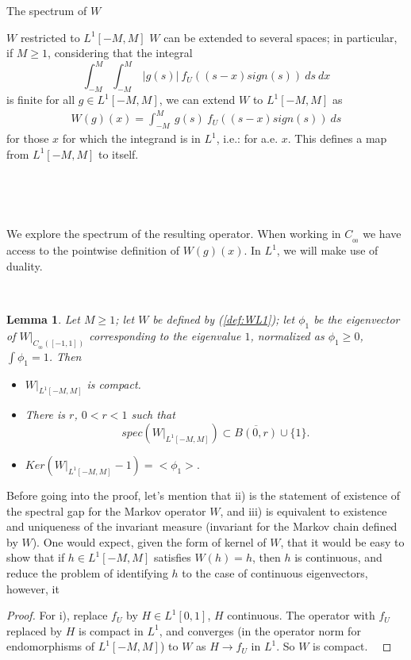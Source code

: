 \documentclass[12pt]{article}
\newtheorem*{lmm}{Lemma}
\begin{document}
\begin{section}{The spectrum of $W$ }
\begin{subsection}{$W$ restricted to $L^1[-M,M]$ }
$W$ can be extended to several spaces; in particular, if $M \ge 1$, considering that the integral 
$$
\int_{-M}^{M} \int_{-M}^{M} \ |g(s)| \ f_U\!( (s-x)sign(s) )\ ds\ dx
$$
is finite for all $g \in L^1[-M,M]$, we can extend $W$ to $L^1[-M,M]$ as
\begin{align} \label{def:WL1}
W(g)(x) = \int_{-M}^{M} \ g(s) \ f_U\!( (s-x)sign(s) )\ ds
\end{align}
for those $x$ for which the integrand is in $L^1$, i.e.: for a.e. $x$. This defines a map from $L^1[-M,M]$ to itself.  

\

\

We explore the spectrum of the resulting operator. When working in $C_{_{0\!0}}$ we have access to the pointwise definition of $W(g)(x)$. In $L^1$, we will make use of duality. 
\ 

\

 


\begin{lmm} Let $M \ge 1$; let $W$ be defined by (\ref{def:WL1}); let $\phi_1$ be the eigenvector of $W\Big|_{C_{_{0\!0}}([-1,1])} $ corresponding to the eigenvalue $1$, normalized as $\phi_1 \ge 0$, $\int \phi_1 = 1$. Then 
	\begin{itemize}
		\item[i.] $W\Big|_{L^1[-M,M]}$ is compact.
		\item[ii.] There is $r$, $0 < r < 1$ such that
		$$
		spec(W\Big|_{L^1[-M,M]}) \subset \overline{B(0,r)} \cup \{1\}. 
		$$ 
		\item[iii.] $Ker(W\Big|_{L^1[-M,M]} - 1) = <\phi_1>.$
	\end{itemize}
\end{lmm}	

Before going into the proof, let's mention that ii) is the statement of existence of the spectral gap for the Markov operator $W$, and iii) is equivalent to existence and uniqueness of the invariant measure (invariant for the Markov chain defined by $W$). One would expect, given the form of kernel of $W$, that it would be easy to show that if $h \in L^1[-M,M]$ satisfies $W(h) = h$, then $h$ is continuous, and reduce the problem of identifying $h$ to the case of continuous eigenvectors, however, it   


\begin{proof}
	For i), replace $f_U$ by $H \in L^1[0,1]$, $H$ continuous. The operator with $f_U$ replaced by $H$ is compact in $L^1$, and converges (in the operator norm for endomorphisms of $L^1[-M,M]$) to $W$ as $H \longrightarrow f_U$ in $L^1$. So $W$ is compact.  
	\
	

\end{proof}
\end{subsection}
\end{section}
\end{document}
